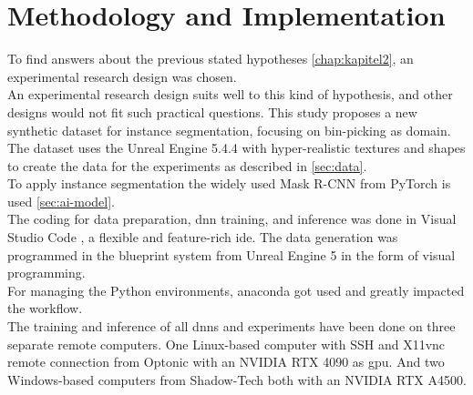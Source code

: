 \chapter{Methodology and Implementation}
\label{chap:kapitel3}
	To find answers about the previous stated hypotheses \ref{chap:kapitel2}, an experimental research design was chosen.\\
	An experimental research design suits well to this kind of hypothesis, and other designs would not fit such practical questions. This study proposes a new synthetic dataset for instance segmentation, focusing on bin-picking as domain. The dataset uses the Unreal Engine 5.4.4 \cite{ue5} with hyper-realistic textures and shapes to create the data for the experiments as described in \ref{sec:data}.\\
	To apply instance segmentation the widely used Mask R-CNN \cite{Kaiming2017} from PyTorch \cite{pytorch} is used \ref{sec:ai-model}.\\
	The coding for data preparation, \ac{dnn} training, and inference was done in Visual Studio Code \cite{vscode}, a flexible and feature-rich \ac{ide}. The data generation was programmed in the blueprint system from Unreal Engine 5 \cite{ue5} in the form of visual programming.\\
	For managing the Python environments, anaconda \cite{anaconda} got used and greatly impacted the workflow.\\
	The training and inference of all \ac{dnn}s and experiments have been done on three separate remote computers. One Linux-based computer with SSH and X11vnc remote connection from Optonic \cite{optonic} with an NVIDIA RTX 4090 as \ac{gpu}. And two Windows-based computers from Shadow-Tech \cite{shadow} both with an NVIDIA RTX A4500.

	
	
	
